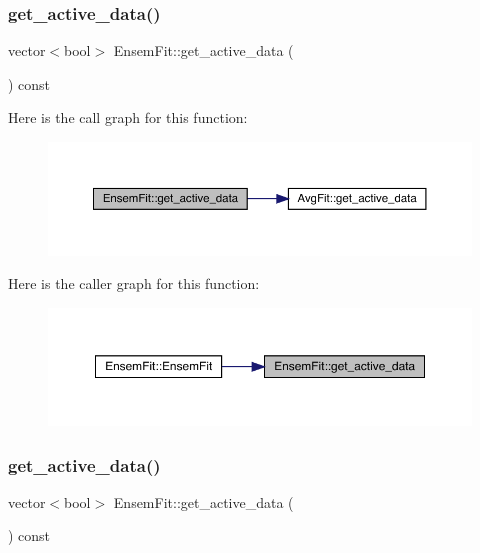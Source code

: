 \subsubsection{\texorpdfstring{get\_active\_data()}{get\_active\_data()}\hspace{0.1cm}{\footnotesize\ttfamily [1/2]}}
{\footnotesize\ttfamily vector$<$bool$>$ Ensem\+Fit\+::get\+\_\+active\+\_\+data (\begin{DoxyParamCaption}{ }\end{DoxyParamCaption}) const\hspace{0.3cm}{\ttfamily [inline]}}

Here is the call graph for this function\+:
\nopagebreak
\begin{figure}[H]
\begin{center}
\leavevmode
\includegraphics[width=350pt]{dc/dae/classEnsemFit_a562d0418f52bf3491752e53a1f65f13b_cgraph}
\end{center}
\end{figure}
Here is the caller graph for this function\+:
\nopagebreak
\begin{figure}[H]
\begin{center}
\leavevmode
\includegraphics[width=350pt]{dc/dae/classEnsemFit_a562d0418f52bf3491752e53a1f65f13b_icgraph}
\end{center}
\end{figure}
\mbox{\label{classEnsemFit_a562d0418f52bf3491752e53a1f65f13b}} 
\subsubsection{\texorpdfstring{get\_active\_data()}{get\_active\_data()}\hspace{0.1cm}{\footnotesize\ttfamily [2/2]}}
{\footnotesize\ttfamily vector$<$bool$>$ Ensem\+Fit\+::get\+\_\+active\+\_\+data (\begin{DoxyParamCaption}{ }\end{DoxyParamCaption}) const\hspace{0.3cm}{\ttfamily [inline]}}

